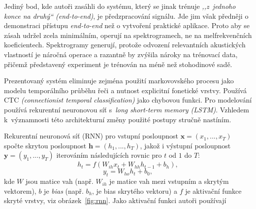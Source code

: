 Jediný bod, kde autoři zasáhli do systému, který se jinak trénuje \textit{,,z~jednoho
konce na druhý`` (end-to-end)}, je předzpracování signálu. Jde jim však předněji
o demonstraci přístupu \textit{end-to-end} než o vytvoření praktické aplikace.
Proto aby se zásah udržel zcela minimálním, operují na spektrogramech, ne na
melfrekvenčních koeficientech. Spektrogramy generují, protože odvození
relevantních akustických vlastností je náročná operace a razantně by zvýšila
nároky na trénovací data, přičemž představený experiment je trénován na méně než
stohodinové sadě.

Prezentovaný systém eliminuje zejména použití markovovského procesu jako modelu
temporálního průběhu řeči a nutnost explicitní fonetické vrstvy. Používá CTC
\textit{(connectionist temporal classification)}\cite{graves2006connectionist} jako chybovou funkci. Pro
modelování používá rekurentní neuronovou síť s~\textit{long short-term memory
(LSTM)}\cite{hochreiter1997long}. Vzhledem k~významnosti této architekturní změny použité postupy stručně
nastíním.

Rekurentní neuronová síť (RNN) pro vstupní posloupnost $\bm{x} = (x_1, ..., x_T)$
spočte skrytou posloupnost $\bm{h} = (h_1, ..., h_T)$, jakož i výstupní posloupnost
$\bm{y} = (y_1, ..., y_T)$ iterováním následujících rovnic pro $t$ od $1$ do $T$:
\begin{equation}
h_t = f(W_{ih}x_t + W_{hh}h_{t-1} + b_h),
\end{equation}
\begin{equation}
y_t = W_{ho}h_t + b_0,
\end{equation}
kde $W$ jsou matice vah (např. $W_{ih}$ je matice vah mezi vstupním a skrytým
vektorem), $b$ je \textit{bias} (např. $b_h$, je bias skrytého vektoru) a $f$ je
aktivační funkce skryté vrstvy, viz obrázek~\ref{fig:rnn}. Jako aktivační funkci autoři používají

